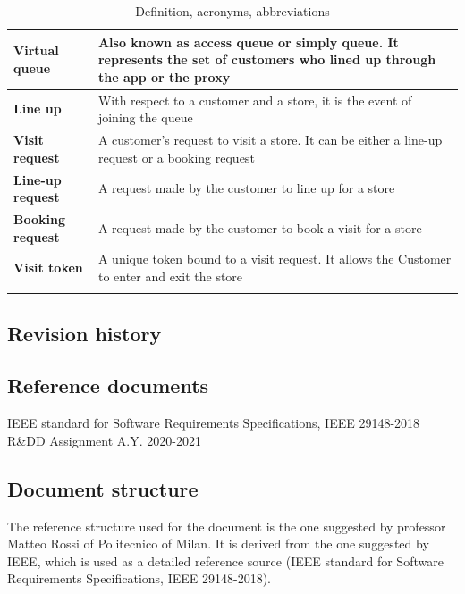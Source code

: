 \documentclass[a4paper,oneside,11pt]{book}   %
\begin{document}
\begin{longtable}[c] { |>{\bfseries{}}C{0.25\textwidth}|V{0.55\textwidth}| }
        Virtual queue & Also known as access queue or simply queue. It represents the set of customers who lined up through the app or the proxy \\ \hline
        Line up & With respect to a customer and a store, it is the event of joining the queue \\ \hline
        Visit request & A customer’s request to visit a store. It can be either a line-up request or a booking request \\ \hline
        Line-up request & A request made by the customer  to line up for a store \\ \hline
        Booking request & A request made by the customer  to book a visit for a store \\ \hline 
        Visit token & A unique token bound to a visit request. It allows the Customer to enter and exit the store \\
        \hline
    \caption{Definition, acronyms, abbreviations}
    \label{table:definitions_acronyms_abbreviations}
    \end{longtable} %
    
    \subsection{Revision history}
    
    \subsection{Reference documents}
    IEEE standard for Software Requirements Specifications, IEEE 29148-2018 
    R\&DD Assignment A.Y. 2020-2021

    \subsection{Document structure}
    The reference structure used for the document is the one suggested by professor Matteo Rossi of Politecnico of Milan. It is derived from the one suggested by IEEE, which is used as a detailed reference source (IEEE standard for Software Requirements Specifications, IEEE 29148-2018).
    
\end{document}
